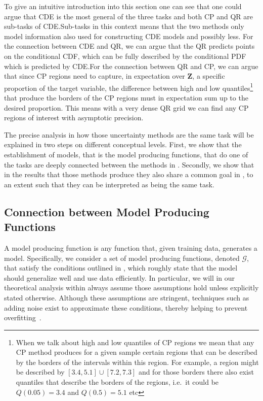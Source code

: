 To give an intuitive introduction into this section one can see that one could argue that CDE is the most general of the three tasks and both CP and QR are sub-tasks of CDE.\@ Sub-tasks in this context means that the two methods only model information also used for constructing CDE models and possibly less. For the connection between CDE and QR, we can argue that the QR predicts points on the conditional CDF, which can be fully described by the conditional PDF which is predicted by CDE.\@ For the connection between QR and CP, we can argue that since CP regions need to capture, in expectation over $\mathbf{Z}$, a specific proportion of the target variable, the difference between high and low quantiles\footnote{When we talk about high and low quantiles of CP regions we mean that any CP method produces for a given sample certain regions that can be described by the borders of the intervals within this region. For example, a region might be described by $[3.4, 5.1] \cup [7.2, 7.3]$ and for those borders there also exist quantiles that describe the borders of the regions, i.e.\ it could be $Q(0.05) = 3.4$ and $Q(0.5) = 5.1$ etc} that produce the borders of the CP regions must in expectation sum up to the desired proportion. This means with a very dense QR grid we can find any CP regions of interest with asymptotic precision.

The precise analysis in how those uncertainty methods are the same task will be explained in two steps on different conceptual levels. First, we show that the establishment of models, that is the model producing functions, that do one of the tasks are deeply connected between the methods in . Secondly, we show that in the results that those methods produce they also share a common goal in , to an extent such that they can be interpreted as being the same task.

\subsection{Connection between Model Producing Functions}\label{sec:connection_model_producing}

A model producing function is any function that, given training data, generates a model. Specifically, we consider a set of model producing functions, denoted $\mathcal{G}$, that satisfy the conditions outlined in , which roughly state that the model should generalize well and use data efficiently. In particular, we will in our theoretical analysis within  always assume those assumptions hold unless explicitly stated otherwise. Although these assumptions are stringent, techniques such as adding noise exist to approximate these conditions, thereby helping to prevent overfitting~\cite{rothfuss2019noise}.

